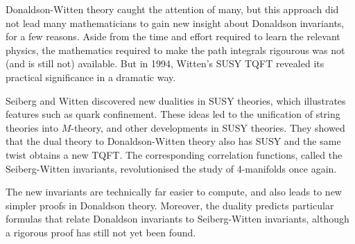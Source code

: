 Donaldson-Witten theory caught the attention of many, but this
approach did not lead many mathematicians to gain new insight about Donaldson
invariants, for a few reasons. Aside from the time and effort required to learn
the relevant physics, the mathematics required to make the path integrals
rigourous was not (and is still not) available. But in 1994, Witten's
SUSY TQFT revealed its practical significance in a dramatic way. 
\begin{comment}
Nathan Seiberg had discovered new techniques to show that
certain SUSY theories constrains the form of the effective Lagrangian to such an
extent that quantum corrections vanish in higher orders in perturbation theory.
\end{comment}
Seiberg and Witten discovered new dualities in SUSY
theories, which illustrates features such as quark confinement. These ideas led to
the unification of string theories into $M$-theory, and other developments in
SUSY theories.  
They showed that the dual theory to Donaldson-Witten theory also has SUSY and
the same twist obtains a new TQFT. The corresponding correlation functions,
called the Seiberg-Witten invariants, revolutionised the study of 4-manifolds
once again. 

The new invariants are technically far easier to compute, and also leads to new
simpler proofs in Donaldson theory. 
Moreover, the duality predicts particular formulas that relate Donaldson
invariants to Seiberg-Witten invariants, although a rigorous proof has still not
yet been found. 

